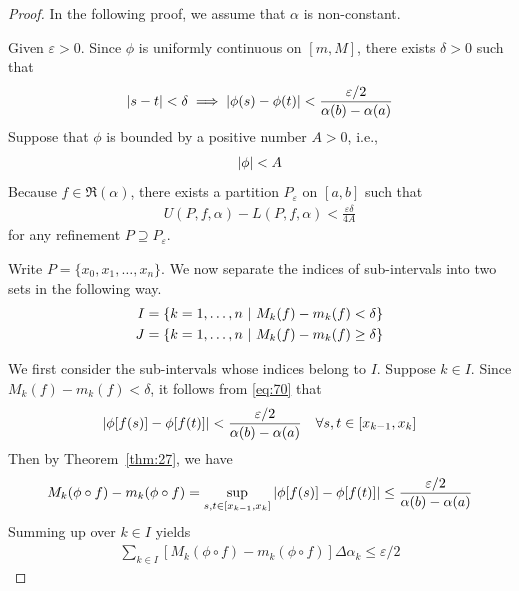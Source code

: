 \documentclass[thmcnt=section, 12pt]{my-elegantbook}
\begin{document}
\begin{proof}
    In the following proof, we assume that $\alpha$ is non-constant.

    Given $\varepsilon > 0$. Since $\phi$ is uniformly continuous on $[m, M]$, there exists $\delta > 0$ such that
    \begin{align}
        \left\lvert s - t \right\rvert < \delta
        \implies \left\lvert \phi(s) - \phi(t) \right\rvert < \frac{\varepsilon / 2}{\alpha(b) - \alpha(a)}
        \label{eq:70}
    \end{align}
    Suppose that $\phi$ is bounded by a positive number $A > 0$, i.e.,
    \begin{align*}
        \left\lvert \phi \right\rvert < A
    \end{align*}
    Because $f \in \mathfrak{R}(\alpha)$, there exists a partition $P_\varepsilon$ on $[a, b]$ such that
    \begin{align}
        U(P,f,\alpha) - L(P,f,\alpha) < \frac{\varepsilon \delta}{4A}
        \label{eq:71}
    \end{align}
    for any refinement $P \supseteq P_\varepsilon$.

    Write $P = \{x_0,x_1, \ldots, x_n\}$. We now separate the indices of sub-intervals into two sets in the following way.
    \begin{align*}
        I & = \left\{ k=1,\ldots,n \ \middle| \ M_k(f) - m_k(f) < \delta \right\}    \\
        J & = \left\{ k=1,\ldots,n \ \middle| \ M_k(f) - m_k(f) \geq \delta \right\}
    \end{align*}

    We first consider the sub-intervals whose indices belong to $I$. Suppose $k \in I$. Since $M_k(f) - m_k(f) < \delta$, it follows from \eqref{eq:70} that
    \begin{align*}
        \left\lvert \phi[f(s)] - \phi[f(t)] \right\rvert
        < \frac{\varepsilon / 2}{\alpha(b) - \alpha(a)}
        \quad \forall s,t \in [x_{k-1}, x_{k}]
    \end{align*}
    Then by Theorem~\ref{thm:27}, we have
    \begin{align*}
        M_k(\phi \circ f) - m_k(\phi \circ f)
        = \sup_{s,t \in [x_{k-1}, x_k]} \left\lvert \phi[f(s)] - \phi[f(t)] \right\rvert
        \leq \frac{\varepsilon / 2}{\alpha(b) - \alpha(a)}
    \end{align*}
    Summing up over $k \in I$ yields
    \begin{align}
        \sum_{k \in I} \left[ M_k(\phi \circ f) - m_k(\phi \circ f) \right] \Delta \alpha_k
        \leq \varepsilon / 2
        \label{eq:72}
    \end{align}


\end{proof}
\end{document}
